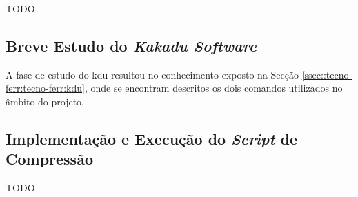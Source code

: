 TODO






\subsection{Breve Estudo do \textit{Kakadu Software}}
\label{ssec::imp-test:holo-compress:estudo-kdu}

A fase de estudo do \ac{kdu} resultou no conhecimento exposto na Secção \ref{ssec::tecno-ferr:tecno-ferr:kdu}, onde se encontram descritos os dois comandos utilizados no âmbito do projeto.


\subsection{Implementação e Execução do \textit{Script} de Compressão}
\label{ssec::imp-tes:holo-compress:script}

TODO


